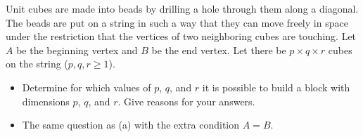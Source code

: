Unit cubes are made into beads by drilling a hole through them along a diagonal. The beads are put on a string in such a way that they can move freely in space under the restriction that the vertices of two neighboring cubes are touching. Let $A$ be the beginning vertex and $B$ be the end vertex. Let there be $p \times q \times r$ cubes on the string ($p, q, r \geq 1$).
\begin{itemize}
\item[(a)] Determine for which values of $p$, $q$, and $r$ it is possible to build a block with dimensions $p$, $q$, and $r$. Give reasons for your answers.
\item[(b)] The same question as (a) with the extra condition $A = B$.
\end{itemize}
